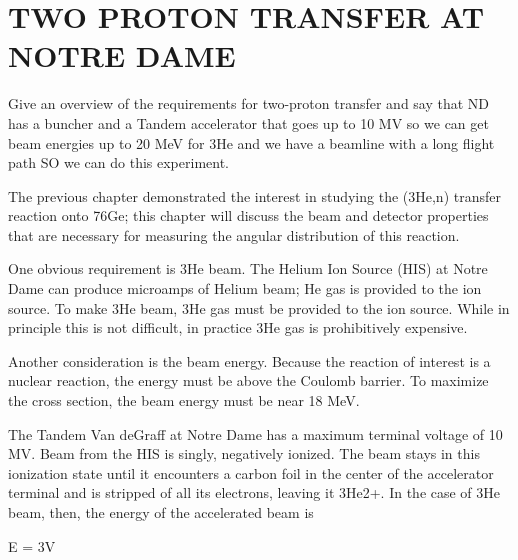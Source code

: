 %
%
%
%
%
%
%
%

%
%

\chapter{TWO PROTON TRANSFER AT NOTRE DAME}
\label{chap:2pExpt}

Give an overview of the requirements for two-proton transfer and say that ND has a buncher and a Tandem accelerator that goes up to 10 MV so we can get beam energies up to 20 MeV for 3He and we have a beamline with a long flight path SO we can do this experiment.

The previous chapter demonstrated the interest in studying the (3He,n) transfer reaction onto 76Ge; this chapter will discuss the beam and detector properties that are necessary for measuring the angular distribution of this reaction.

One obvious requirement is 3He beam.  The Helium Ion Source (HIS) at Notre Dame can produce microamps of Helium beam; He gas is provided to the ion source.  To make 3He beam, 3He gas must be provided to the ion source.  While in principle this is not difficult, in practice 3He gas is prohibitively expensive.  

Another consideration is the beam energy.  Because the reaction of interest is a nuclear reaction, the energy must be above the Coulomb barrier.  To maximize the cross section, the beam energy must be near 18 MeV.

The Tandem Van deGraff at Notre Dame has a maximum terminal voltage of 10 MV.  Beam from the HIS is singly, negatively ionized.  The beam stays in this ionization state until it encounters a carbon foil in the center of the accelerator terminal and is stripped of all its electrons, leaving it 3He2+.  In the case of 3He beam, then, the energy of the accelerated beam is 

E = 3V

